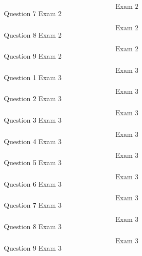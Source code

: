 \documentclass{article}
\begin{document}
    $$\text{Exam 2}$$
    Question 7 Exam 2
    \pagebreak

    $$\text{Exam 2}$$
    Question 8 Exam 2
    \pagebreak

    $$\text{Exam 2}$$
    Question 9 Exam 2
    \pagebreak

    $$\text{Exam 3}$$
    Question 1 Exam 3\\
    \pagebreak

    $$\text{Exam 3}$$
    Question 2 Exam 3
    \pagebreak

    $$\text{Exam 3}$$
    Question 3 Exam 3
    \pagebreak

    $$\text{Exam 3}$$
    Question 4 Exam 3
    \pagebreak

    $$\text{Exam 3}$$
    Question 5 Exam 3
    \pagebreak

    $$\text{Exam 3}$$
    Question 6 Exam 3
    \pagebreak

    $$\text{Exam 3}$$
    Question 7 Exam 3
    \pagebreak

    $$\text{Exam 3}$$
    Question 8 Exam 3
    \pagebreak

    $$\text{Exam 3}$$
    Question 9 Exam 3
    \pagebreak
\end{document}
